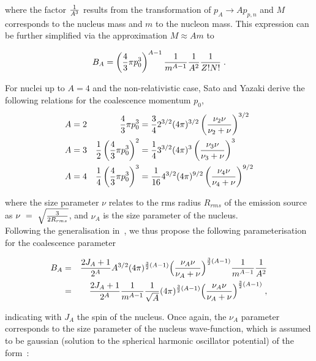 \documentclass[a4paper,11pt]{scrartcl} %
\begin{document}
\begin{appendix}
\noindent where the factor ${1 \over A^{3}}$ results from the transformation of $p_{A} \rightarrow A p_{p,n}$ and $M$ corresponds to the nucleus mass and $m$ to the nucleon mass. This expression can be further simplified via the approximation $M \approx A m$ to

\begin{equation}
B_{A} = \left({4 \over 3} \pi p_{0}^{3}\right)^{A-1} {1 \over m^{A-1}} {1 \over A^{2}}{\frac{1}{Z! N!}} \; .
\end{equation}

\noindent For nuclei up to $A = 4$ and the non-relativistic case, Sato and Yazaki derive the following relations for the coalescence momentum $p_{0}$, 
%
\begin{align}
	A& =2&
	{4 \over 3} \pi p_{0}^{3}& ={3 \over 4}2^{3/2}(4\pi)^{3/2} \left(\frac{\nu_{2}\nu}{\nu_{2} + \nu}\right)^{3/2}\\
	A& =3&
	{1 \over 2} \left( {4 \over 3} \pi p_{0}^{3}\right)^{2}& ={1 \over 4} 3^{3/2} (4\pi)^{3} \left(\frac{\nu_{3}\nu}{\nu_{3} + \nu}\right)^{3}\\
	A& =4&  
	{1 \over 4} \left({4 \over 3} \pi p_{0}^{3}\right)^{3}& = {1 \over 16} 4^{3/2} (4\pi)^{9/2} \left(\frac{\nu_{4}\nu}{\nu_{4}+ \nu}\right)^{9/2}
\end{align}

\noindent where the size parameter $\nu$ relates to the rms radius $R_{rms}$ of the emission source as $\nu~=~\sqrt{3 \over 2 R_{rms}}$, and $\nu_{A}$ is the size parameter of the nucleus. 
\\Following the generalisation in~\cite{Nagle:1996vp}, we thus propose the following parameterisation for the coalescence parameter

\begin{eqnarray}
B_{A} &=& {2J_{A} + 1 \over 2^{A}} A^{3/2} (4\pi)^{{3\over2}(A-1)} \Bigl({\nu_{A}\nu \over \nu_{A}+ \nu}\Bigr)^{{3\over2}(A-1)} {1 \over m^{A-1}} {1 \over A^{2}}  \\
\label{eq:SatoGeneralised}
           &=&  {2J_{A} + 1 \over 2^{A}} {1 \over m^{A-1}} {1 \over \sqrt{A}} (4\pi)^{{3\over2}(A-1)} \Bigl({\nu_{A}\nu \over \nu_{A}+ \nu}\Bigr)^{{3\over2}(A-1)} \;,
\end{eqnarray}

\noindent indicating with $J_{A}$ the spin of the nucleus.
Once again, the $\nu_{A}$ parameter corresponds to the size parameter of the nucleus wave-function, which is assumed to be gaussian (solution to the spherical harmonic oscillator potential) of the form~\cite{Sato:1981ez,Bergstrom:1979gpv}:


\end{appendix}
\end{document}
